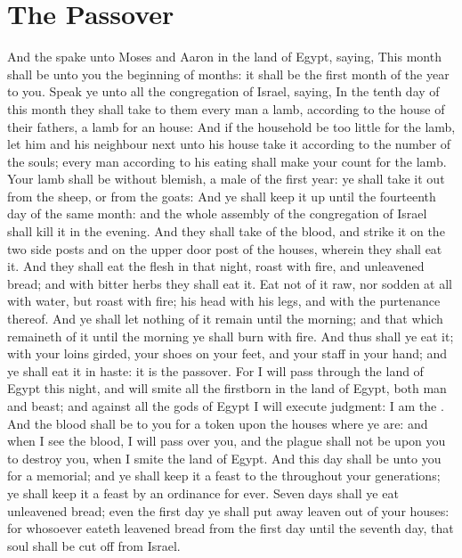 \section*{The Passover}
\begin{biblechapter} %
\verse And the \LORD spake unto Moses and Aaron in the land of Egypt, saying,
\verse This month shall be unto you the beginning of months: it shall be the first month of the year to you.
\verse Speak ye unto all the congregation of Israel, saying, In the tenth day of this month they shall take to them every man a lamb, according to the house of their fathers, a lamb for an house:
\verse And if the household be too little for the lamb, let him and his neighbour next unto his house take it according to the number of the souls; every man according to his eating shall make your count for the lamb.
\verse Your lamb shall be without blemish, a male of the first year: ye shall take it out from the sheep, or from the goats:
\verse And ye shall keep it up until the fourteenth day of the same month: and the whole assembly of the congregation of Israel shall kill it in the evening.
\verse And they shall take of the blood, and strike it on the two side posts and on the upper door post of the houses, wherein they shall eat it.
\verse And they shall eat the flesh in that night, roast with fire, and unleavened bread; and with bitter herbs they shall eat it.
\verse Eat not of it raw, nor sodden at all with water, but roast with fire; his head with his legs, and with the purtenance thereof.
\verse And ye shall let nothing of it remain until the morning; and that which remaineth of it until the morning ye shall burn with fire.
\verse And thus shall ye eat it; with your loins girded, your shoes on your feet, and your staff in your hand; and ye shall eat it in haste: it is the \LORDs passover.
\verse For I will pass through the land of Egypt this night, and will smite all the firstborn in the land of Egypt, both man and beast; and against all the gods of Egypt I will execute judgment: I am the \LORD.
\verse And the blood shall be to you for a token upon the houses where ye are: and when I see the blood, I will pass over you, and the plague shall not be upon you to destroy you, when I smite the land of Egypt.
\verse And this day shall be unto you for a memorial; and ye shall keep it a feast to the \LORD throughout your generations; ye shall keep it a feast by an ordinance for ever.
\verse Seven days shall ye eat unleavened bread; even the first day ye shall put away leaven out of your houses: for whosoever eateth leavened bread from the first day until the seventh day, that soul shall be cut off from Israel.

\end{biblechapter}
